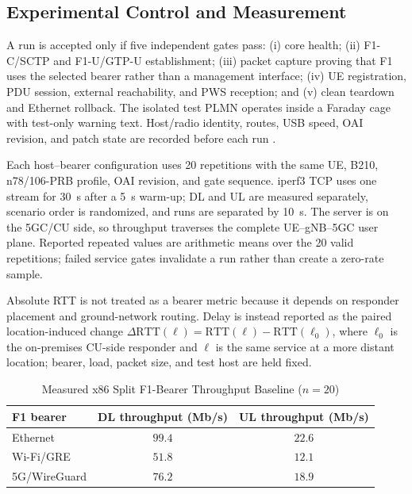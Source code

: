 \documentclass[conference]{IEEEtran}
\begin{document}
\subsection{Experimental Control and Measurement}
A run is accepted only if five independent gates pass: (i) core health; (ii)
F1-C/SCTP and F1-U/GTP-U establishment; (iii) packet capture proving that F1
uses the selected bearer rather than a management interface; (iv) UE
registration, PDU session, external reachability, and PWS reception; and (v)
clean teardown and Ethernet rollback. The isolated test PLMN operates inside
a Faraday cage with test-only warning text. Host/radio identity, routes, USB
speed, OAI revision, and patch state are recorded before each run
\cite{artifactrepo}.

Each host--bearer configuration uses 20 repetitions with the same UE, B210,
n78/106-PRB profile, OAI revision, and gate sequence. iperf3 TCP uses one
stream for 30~s after a 5~s warm-up; DL and UL are measured separately,
scenario order is randomized, and runs are separated by 10~s. The server is on
the 5GC/CU side, so throughput traverses the complete UE--gNB--5GC user plane.
Reported repeated values are arithmetic means over the 20 valid repetitions;
failed service gates invalidate a run rather than create a zero-rate sample.

Absolute RTT is not treated as a bearer metric because it depends on responder
placement and ground-network routing. Delay is instead reported as the paired
location-induced change $\Delta\mathrm{RTT}(\ell)=\mathrm{RTT}(\ell)-
\mathrm{RTT}(\ell_0)$, where $\ell_0$ is the on-premises CU-side responder and
$\ell$ is the same service at a more distant location; bearer, load, packet
size, and test host are held fixed.


\begin{table}[t]
\caption{Measured x86 Split F1-Bearer Throughput Baseline ($n=20$)}
\label{tab:f1baseline}
\centering\scriptsize
\begin{tabularx}{\columnwidth}{@{}Xcc@{}}
\toprule
\textbf{F1 bearer} & \textbf{DL throughput (Mb/s)} & \textbf{UL throughput (Mb/s)}\\
\midrule
Ethernet & $99.4$ & $22.6$\\
Wi-Fi/GRE & $51.8$ & $12.1$\\
5G/WireGuard & $76.2$ & $18.9$\\
\bottomrule
\end{tabularx}
\end{table}
\end{document}
